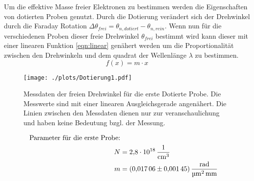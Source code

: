 Um die effektive Masse freier Elektronen zu bestimmen werden die Eigenschaften von dotierten Proben genutzt.
Durch die Dotierung verändert sich der Drehwinkel durch die Faraday Rotation $\Delta \theta_{frei} = \theta_{n,dotiert} - \theta_{n,rein} $.
Wenn nun für die verschiedenen Proben dieser freie Drehwinkel $\theta_{frei}$ bestimmt wird kann dieser mit einer linearen Funktion \ref{eqn:linear} genähert werden um die Proportionalität zwischen den Drehwinkeln und dem quadrat der Wellenlänge $\lambda$ zu bestimmen.
\begin{equation}
    f(x) = m\cdot x
    \label{eqn:linear}
\end{equation}
\begin{figure}[ht]
    \centering
    \texttt{[image: ./plots/Dotierung1.pdf]}
    \caption{Messdaten der freien Drehwinkel für die erste Dotierte Probe. Die Messwerte sind mit einer linearen Ausgleichsgerade angenähert. Die Linien zwischen den Messdaten dienen nur zur veranschaulichung und haben keine Bedeutung bzgl. der Messung.}
    \label{fig:dot1}
\end{figure}
\begin{align*}
    \text{Parameter für die erste Probe:}\\
    N &= \SI{2.8e18}{\per \centi \metre \cubed}\\
    m &= \SI{0.01706 +- 0.00145}{\radian \per \micro \metre \squared \per \milli \metre}
\end{align*}

